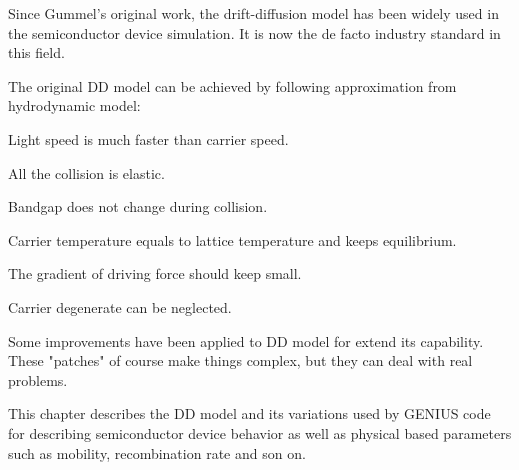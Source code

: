 \documentclass[oneside,12pt]{cgd_book}
\begin{document}
Since Gummel's original work, the drift-diffusion model has been widely used in the semiconductor device
    simulation. It is now the de facto industry standard in this field.
\par
The original DD model can be achieved by following approximation from hydrodynamic model:
\begin{compactitem}
\item Light speed is much faster than carrier speed.
\par
\item All the collision is elastic.
\par
\item Bandgap does not change during collision.
\par
\item Carrier temperature equals to lattice temperature and keeps equilibrium.
\par
\item The gradient of driving force should keep small.
\par
\item Carrier degenerate can be neglected.
\par
\end{compactitem}
\par
Some improvements have been applied to DD model for extend its capability. These "patches" of course make
    things complex, but they can deal with real problems.
\par
This chapter describes the DD model and its variations used by GENIUS code for describing semiconductor device
    behavior as well as physical based parameters such as mobility, recombination rate and son on.
\par
\end{document}
